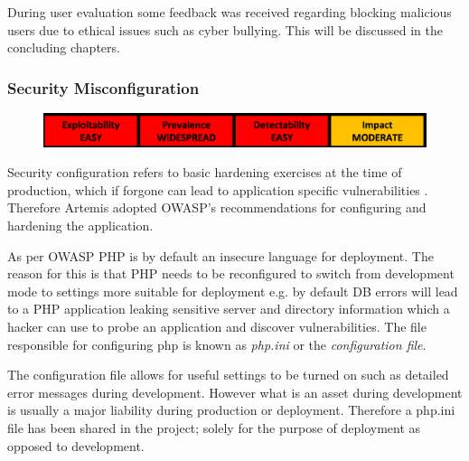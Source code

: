     During user evaluation some feedback was received regarding blocking malicious users due to ethical issues such as cyber bullying. This will be discussed in the concluding chapters.
    
    \newpage
    \subsubsection{Security Misconfiguration}
    
    \begin{figure}[h]
    	\centering
    	\includegraphics[scale=0.5,center]{chapters/chapter03/figures/brokenAccess.png}
    	\label{Security Misconfiguration}
    \end{figure}
    
    Security configuration refers to basic hardening exercises at the time of production, which if forgone can lead to application specific vulnerabilities \cite{OWASP2017}. Therefore Artemis adopted OWASP's recommendations for configuring and hardening the application.
    
    As per OWASP \cite{OWASPa} PHP is by default an insecure language for deployment. The reason for this is that PHP needs to be reconfigured to switch from development mode to settings more suitable for deployment e.g. by default DB errors will lead to a PHP application leaking sensitive server and directory information which a hacker can use to probe an application and discover vulnerabilities. The file responsible for configuring php is known as \textit{php.ini} or the \textit{configuration file}\cite{PHPa}.
    
    The configuration file allows for useful settings to be turned on such as detailed error messages during development. However what is an asset during development is usually a major liability during production or deployment. Therefore a php.ini file has been shared in the project; solely for the purpose of deployment as opposed to development.
    
